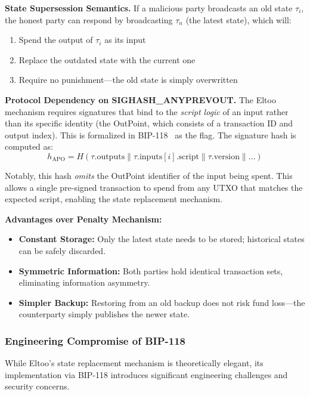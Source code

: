 \textbf{State Supersession Semantics.} If a malicious party broadcasts an old state $\tau_i$, the honest party can respond by broadcasting $\tau_n$ (the latest state), which will:
\begin{enumerate}
    \item Spend the output of $\tau_i$ as its input
    \item Replace the outdated state with the current one
    \item Require no punishment---the old state is simply overwritten
\end{enumerate}

\textbf{Protocol Dependency on SIGHASH\_ANYPREVOUT.} The Eltoo mechanism requires signatures that bind to the \textit{script logic} of an input rather than its specific identity (the OutPoint, which consists of a transaction ID and output index). This is formalized in BIP-118~\cite{bip118} as the  flag. The signature hash is computed as:
$$ h_{\mathrm{APO}} = H(\tau.\text{outputs} \parallel \tau.\text{inputs}[i].\text{script} \parallel \tau.\text{version} \parallel \dots) $$

Notably, this hash \textit{omits} the OutPoint identifier of the input being spent. This allows a single pre-signed transaction to spend from any UTXO that matches the expected script, enabling the state replacement mechanism.

\textbf{Advantages over Penalty Mechanism:}
\begin{itemize}
    \item \textbf{Constant Storage:} Only the latest state needs to be stored; historical states can be safely discarded.
    \item \textbf{Symmetric Information:} Both parties hold identical transaction sets, eliminating information asymmetry.
    \item \textbf{Simpler Backup:} Restoring from an old backup does not risk fund loss---the counterparty simply publishes the newer state.
\end{itemize}

\subsubsection{Engineering Compromise of BIP-118}

While Eltoo's state replacement mechanism is theoretically elegant, its implementation via BIP-118 introduces significant engineering challenges and security concerns.

